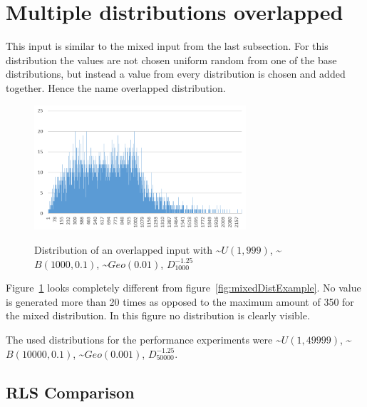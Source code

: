 \section{Multiple distributions overlapped}
This input is similar to the mixed input from the last subsection.
For this distribution the values are not chosen uniform random from one of the base distributions, but instead a value from every distribution is chosen and added together.
Hence the name overlapped distribution.

\begin{figure}[h]
      \caption{Distribution of an overlapped input with \textasciitilde$U(1,999)$, \textasciitilde$B(1000,0.1)$, \textasciitilde$Geo(0.01)$, $D^{-1.25}_{1000}$}
      \centering
      \includegraphics[width=0.7\textwidth]{figures/images/numberGenerator/overlapped.png}\label{fig:overlappedDistExample}
\end{figure}

Figure~\ref{fig:overlappedDistExample} looks completely different from figure~\ref{fig:mixedDistExample}.
No value is generated more than 20 times as opposed to the maximum amount of 350 for the mixed distribution.
In this figure no distribution is clearly visible.

The used distributions for the performance experiments were \textasciitilde$U(1,49999)$, \textasciitilde$B(10000,0.1)$, \textasciitilde$Geo(0.001)$, $D^{-1.25}_{50000}$.
\subsection{RLS Comparison}




